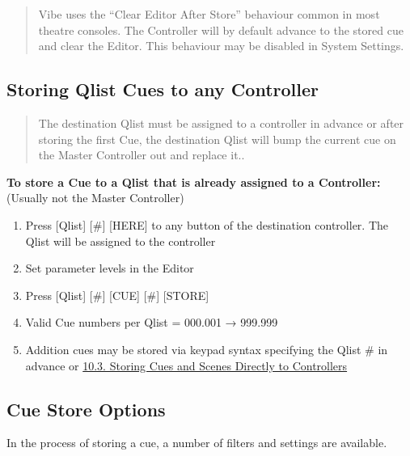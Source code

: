 \documentclass[
]{article}
\begin{document}
\begin{quote}
Vibe uses the ``Clear Editor After Store'' behaviour common in most theatre consoles.
{The Controller will by default advance to the stored cue and clear the Editor}. This behaviour may be disabled in System Settings.
\end{quote}

\hypertarget{storing-qlist-cues-to-any-controller}{%
\subsection{Storing Qlist Cues to any Controller}\label{storing-qlist-cues-to-any-controller}}

\begin{quote}
{The destination Qlist must be assigned to a controller in advance or after storing the first Cue, the destination Qlist will bump the current cue on the Master Controller out and replace it.}.
\end{quote}

\textbf{To store a Cue to a Qlist that is already assigned to a Controller:} (Usually not the Master Controller)

\begin{enumerate}
\def\labelenumi{\arabic{enumi}.}
\item
  Press {[}Qlist{]} {[}\#{]} {[}HERE{]} to any button of the destination controller. The Qlist will be assigned to the controller
\item
  Set parameter levels in the Editor
\item
  Press {[}Qlist{]} {[}\#{]} {[}CUE{]} {[}\#{]} {[}STORE{]}
\item
  Valid Cue numbers per Qlist = 000.001 → 999.999
\item
  Addition cues may be stored via keypad syntax specifying the Qlist \# in advance or \href{https://vibemanual.compulite.com/programming-cues-and-scenes.html\#storing-cues-and-scenes-directly-to-controllers}{10.3. Storing Cues and Scenes Directly to Controllers}\hspace{0pt}
\end{enumerate}

\hypertarget{cue-store-options-1}{%
\subsection{Cue Store Options}\label{cue-store-options-1}}

In the process of storing a cue, a number of filters and settings are available.
\end{document}
